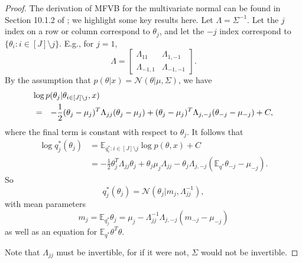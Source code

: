 \documentclass{article}\usepackage[]{graphicx}\usepackage[]{color}
\newcommand{\gauss}{\mathcal{N}} %
\newcommand{\constant}{C} %
\theoremstyle{plain}
\newcommand{\mbe}{\mathbb{E}}
\begin{document}
\begin{proof}
  The derivation of MFVB for the multivariate normal can be found in Section
  10.1.2 of \citep{bishop:2006:pattern}; we highlight some key results here. Let
  $\Lambda = \Sigma^{-1}$. Let the $j$ index on a row or column correspond to
  $\theta_j$, and let the $-j$ index correspond to $\{\theta_{i}: i \in
  [J]\setminus j\}$. E.g., for $j=1$,
  $$
    \Lambda
      = \left[ \begin{array}{ll}
          \Lambda_{11} & \Lambda_{1,-1} \\
          \Lambda_{-1,1} & \Lambda_{-1,-1}
        \end{array} \right].
  $$
  By the assumption that $p(\theta | x) = \gauss(\theta | \mu, \Sigma)$, we have
\begin{eqnarray}\label{eq:mvn_variational_dist}
  \lefteqn{\log p(\theta_{j} | \theta_{i \in [J]\setminus j}, x)} \nonumber\\
      &=& -\frac{1}{2} (\theta_{j} - \mu_{j})^{T} \Lambda_{jj} (\theta_j - \mu_j) +
         (\theta_{j} - \mu_{j})^{T} \Lambda_{j,-j} (\theta_{-j} - \mu_{-j}) + \constant,
\end{eqnarray}
%
  where the final term is constant with respect to $\theta_{j}$.
  It follows that
  \begin{align*}
    \log q^{*}_{j}(\theta_j)
      &= \mbe_{q^{*}_{i}: i \in [J]\setminus j} \log p(\theta, x) + \constant \\
      &= -\frac{1}{2} \theta_{j}^{T} \Lambda_{jj} \theta_j + \theta_j \mu_j \Lambda_{jj} - \theta_j \Lambda_{j,-j} (\mbe_{q^{*}} \theta_{-j} - \mu_{-j}).
  \end{align*}
  So
  \begin{equation*}
    q^*_j(\theta_j) = \gauss(\theta_j | m_{j}, \Lambda_{jj}^{-1}),
  \end{equation*}
  with mean parameters
  \begin{equation} \label{eq:mvn_stable_point}
    m_{j} = \mbe_{q^{*}_j} \theta_j = \mu_{j} - \Lambda_{jj}^{-1} \Lambda_{j,-j} (m_{-j} - \mu_{-j})
  \end{equation}
  as well as an equation for $\mbe_{q^{*}} \theta^T \theta$.

Note that $\Lambda_{jj}$ must be invertible, for if it were not, $\Sigma$ would
not be invertible.


\end{proof}
\end{document}
